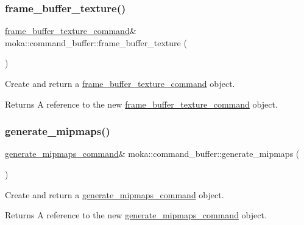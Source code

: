 \subsubsection{\texorpdfstring{frame\_buffer\_texture()}{frame\_buffer\_texture()}}
{\footnotesize\ttfamily \mbox{\hyperlink{classmoka_1_1frame__buffer__texture__command}{frame\+\_\+buffer\+\_\+texture\+\_\+command}}\& moka\+::command\+\_\+buffer\+::frame\+\_\+buffer\+\_\+texture (\begin{DoxyParamCaption}{ }\end{DoxyParamCaption})}



Create and return a \mbox{\hyperlink{classmoka_1_1frame__buffer__texture__command}{frame\+\_\+buffer\+\_\+texture\+\_\+command}} object. 

\begin{DoxyReturn}{Returns}
A reference to the new \mbox{\hyperlink{classmoka_1_1frame__buffer__texture__command}{frame\+\_\+buffer\+\_\+texture\+\_\+command}} object. 
\end{DoxyReturn}
\mbox{\label{classmoka_1_1command__buffer_af16aae45ec53cf532bcc7c0bea412b80}} 
\subsubsection{\texorpdfstring{generate\_mipmaps()}{generate\_mipmaps()}}
{\footnotesize\ttfamily \mbox{\hyperlink{classmoka_1_1generate__mipmaps__command}{generate\+\_\+mipmaps\+\_\+command}}\& moka\+::command\+\_\+buffer\+::generate\+\_\+mipmaps (\begin{DoxyParamCaption}{ }\end{DoxyParamCaption})}



Create and return a \mbox{\hyperlink{classmoka_1_1generate__mipmaps__command}{generate\+\_\+mipmaps\+\_\+command}} object. 

\begin{DoxyReturn}{Returns}
A reference to the new \mbox{\hyperlink{classmoka_1_1generate__mipmaps__command}{generate\+\_\+mipmaps\+\_\+command}} object. 
\end{DoxyReturn}
\mbox{\label{classmoka_1_1command__buffer_ae9f8480f6f86739d0176b7646f699a85}} 
